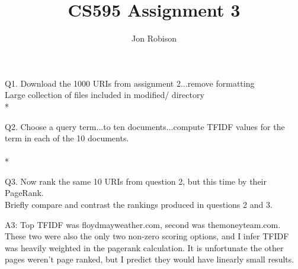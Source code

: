 \documentclass{article}
\begin{document}
\author{Jon Robison}
\title{CS595 Assignment 3}
\maketitle

Q1. Download the 1000 URIs from assignment 2...remove formatting \\
Large collection of files included in modified/ directory
\\*

Q2. Choose a query term...to ten documents...compute TFIDF values for the term
in each of the 10 documents. \\
%
\\*

Q3. Now rank the same 10 URIs from question 2, but this time by their
PageRank. \\
%
Briefly compare and contrast the rankings produced in questions 2
and 3.

A3: Top TFIDF was floydmayweather.com, second was themoneyteam.com. These two
were also the only two non-zero scoring options, and I infer TFIDF was heavily
weighted in the pagerank calculation. It is unfortunate the other pages weren't
page ranked, but I predict they would have linearly small results.
\end{document}
